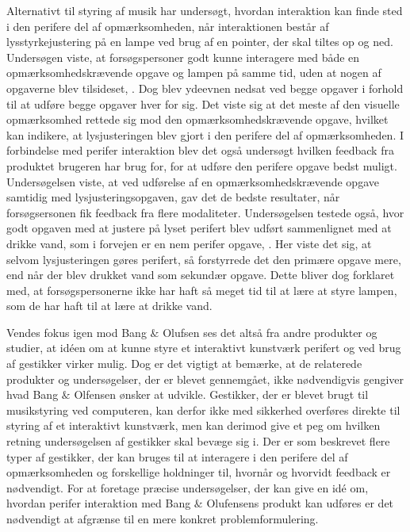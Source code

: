 Alternativt til styring af musik har \textcite[s. 1]{PDF:FacilitatingPIDesignAndEvaluation} undersøgt, hvordan interaktion kan finde sted i den perifere del af opmærksomheden, når interaktionen består af lysstyrkejustering på en lampe ved brug af en pointer, der skal tiltes op og ned. Undersøgen viste, at forsøgspersoner godt kunne interagere med både en opmærksomhedskrævende opgave og lampen på samme tid, uden at nogen af opgaverne blev tilsideset, \parencite[ss. 20-21]{PDF:FacilitatingPIDesignAndEvaluation}. Dog blev ydeevnen nedsat ved begge opgaver i forhold til at udføre begge opgaver hver for sig. Det viste sig at det meste af den visuelle opmærksomhed rettede sig mod den opmærksomhedskrævende opgave, hvilket kan indikere, at lysjusteringen blev gjort i den perifere del af opmærksomheden. I forbindelse med perifer interaktion blev det også undersøgt hvilken feedback fra produktet brugeren har brug for, for at udføre den perifere opgave bedst muligt. Undersøgelsen viste, at ved udførelse af en opmærksomhedskrævende opgave samtidig med lysjusteringsopgaven, gav det de bedste resultater, når forsøgsersonen fik feedback fra flere modaliteter.  Undersøgelsen testede også, hvor godt opgaven med at justere på lyset perifert blev udført sammenlignet med at drikke vand, som i forvejen er en nem perifer opgave, \parencite[s. 20]{PDF:FacilitatingPIDesignAndEvaluation}. Her viste det sig, at selvom lysjusteringen gøres perifert, så forstyrrede det den primære opgave mere, end når der blev drukket vand som sekundær opgave. Dette bliver dog forklaret med, at forsøgspersonerne ikke har haft så meget tid til at lære at styre lampen, som de har haft til at lære at drikke vand. 

Vendes fokus igen mod Bang $\&$ Olufsen ses det altså fra andre produkter og studier, at idéen om at kunne styre et interaktivt kunstværk perifert og ved brug af gestikker virker mulig. Dog er det vigtigt at bemærke, at de relaterede produkter og undersøgelser, der er blevet gennemgået, ikke nødvendigvis gengiver hvad Bang $\&$ Olfensen ønsker at udvikle. Gestikker, der er blevet brugt til musikstyring ved computeren, kan derfor ikke med sikkerhed overføres direkte til styring af et interaktivt kunstværk, men kan derimod give et peg om hvilken retning undersøgelsen af gestikker skal bevæge sig i. Der er som beskrevet flere typer af gestikker, der kan bruges til at interagere i den perifere del af opmærksomheden og forskellige holdninger til, hvornår og hvorvidt feedback er nødvendigt. For at foretage præcise undersøgelser, der kan give en idé om, hvordan perifer interaktion med Bang $\&$ Olufensens produkt kan udføres er det nødvendigt at afgrænse til en mere konkret problemformulering.
